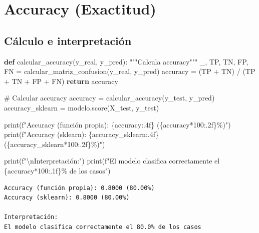 \documentclass[
  doc,
  floatsintext,
  longtable,
  a4paper,
  nolmodern,
  notxfonts,
  notimes,
  12pt,
  colorlinks=true,linkcolor=blue,citecolor=blue,urlcolor=blue]{apa7}
\newenvironment{Shaded}{\begin{snugshade}}{\end{snugshade}}
\newcommand{\BuiltInTok}[1]{\textcolor[rgb]{0.00,0.23,0.31}{#1}}
\newcommand{\CharTok}[1]{\textcolor[rgb]{0.13,0.47,0.30}{#1}}
\newcommand{\CommentTok}[1]{\textcolor[rgb]{0.37,0.37,0.37}{#1}}
\newcommand{\ControlFlowTok}[1]{\textcolor[rgb]{0.00,0.23,0.31}{\textbf{#1}}}
\newcommand{\DecValTok}[1]{\textcolor[rgb]{0.68,0.00,0.00}{#1}}
\newcommand{\KeywordTok}[1]{\textcolor[rgb]{0.00,0.23,0.31}{\textbf{#1}}}
\newcommand{\NormalTok}[1]{\textcolor[rgb]{0.00,0.23,0.31}{#1}}
\newcommand{\OperatorTok}[1]{\textcolor[rgb]{0.37,0.37,0.37}{#1}}
\newcommand{\SpecialCharTok}[1]{\textcolor[rgb]{0.37,0.37,0.37}{#1}}
\newcommand{\SpecialStringTok}[1]{\textcolor[rgb]{0.13,0.47,0.30}{#1}}
\begin{document}
\section{Accuracy (Exactitud)}\label{accuracy-exactitud}

\subsection{Cálculo e
interpretación}\label{cuxe1lculo-e-interpretaciuxf3n}

\begin{Shaded}
\begin{Highlighting}[]
\KeywordTok{def}\NormalTok{ calcular\_accuracy(y\_real, y\_pred):}
    \CommentTok{"""Calcula accuracy"""}
\NormalTok{    \_, TP, TN, FP, FN }\OperatorTok{=}\NormalTok{ calcular\_matriz\_confusion(y\_real, y\_pred)}
\NormalTok{    accuracy }\OperatorTok{=}\NormalTok{ (TP }\OperatorTok{+}\NormalTok{ TN) }\OperatorTok{/}\NormalTok{ (TP }\OperatorTok{+}\NormalTok{ TN }\OperatorTok{+}\NormalTok{ FP }\OperatorTok{+}\NormalTok{ FN)}
    \ControlFlowTok{return}\NormalTok{ accuracy}

\CommentTok{\# Calcular accuracy}
\NormalTok{accuracy }\OperatorTok{=}\NormalTok{ calcular\_accuracy(y\_test, y\_pred)}
\NormalTok{accuracy\_sklearn }\OperatorTok{=}\NormalTok{ modelo.score(X\_test, y\_test)}

\BuiltInTok{print}\NormalTok{(}\SpecialStringTok{f"Accuracy (función propia): }\SpecialCharTok{\{}\NormalTok{accuracy}\SpecialCharTok{:.4f\}}\SpecialStringTok{ (}\SpecialCharTok{\{}\NormalTok{accuracy}\OperatorTok{*}\DecValTok{100}\SpecialCharTok{:.2f\}}\SpecialStringTok{\%)"}\NormalTok{)}
\BuiltInTok{print}\NormalTok{(}\SpecialStringTok{f"Accuracy (sklearn): }\SpecialCharTok{\{}\NormalTok{accuracy\_sklearn}\SpecialCharTok{:.4f\}}\SpecialStringTok{ (}\SpecialCharTok{\{}\NormalTok{accuracy\_sklearn}\OperatorTok{*}\DecValTok{100}\SpecialCharTok{:.2f\}}\SpecialStringTok{\%)"}\NormalTok{)}

\BuiltInTok{print}\NormalTok{(}\SpecialStringTok{f"}\CharTok{\textbackslash{}n}\SpecialStringTok{Interpretación:"}\NormalTok{)}
\BuiltInTok{print}\NormalTok{(}\SpecialStringTok{f"El modelo clasifica correctamente el }\SpecialCharTok{\{}\NormalTok{accuracy}\OperatorTok{*}\DecValTok{100}\SpecialCharTok{:.1f\}}\SpecialStringTok{\% de los casos"}\NormalTok{)}
\end{Highlighting}
\end{Shaded}

\begin{verbatim}
Accuracy (función propia): 0.8000 (80.00%)
Accuracy (sklearn): 0.8000 (80.00%)

Interpretación:
El modelo clasifica correctamente el 80.0% de los casos
\end{verbatim}
\end{document}
